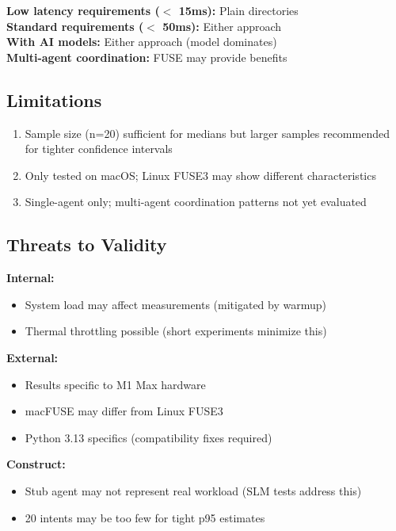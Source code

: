 \documentclass[11pt]{article}
\begin{document}
\textbf{Low latency requirements ($<$ 15ms):} Plain directories\\
\textbf{Standard requirements ($<$ 50ms):} Either approach\\
\textbf{With AI models:} Either approach (model dominates)\\
\textbf{Multi-agent coordination:} FUSE may provide benefits

\subsection{Limitations}

\begin{enumerate}
\item Sample size (n=20) sufficient for medians but larger samples recommended for tighter confidence intervals
\item Only tested on macOS; Linux FUSE3 may show different characteristics
\item Single-agent only; multi-agent coordination patterns not yet evaluated
\end{enumerate}

\subsection{Threats to Validity}

\textbf{Internal:}
\begin{itemize}
\item System load may affect measurements (mitigated by warmup)
\item Thermal throttling possible (short experiments minimize this)
\end{itemize}

\textbf{External:}
\begin{itemize}
\item Results specific to M1 Max hardware
\item macFUSE may differ from Linux FUSE3
\item Python 3.13 specifics (compatibility fixes required)
\end{itemize}

\textbf{Construct:}
\begin{itemize}
\item Stub agent may not represent real workload (SLM tests address this)
\item 20 intents may be too few for tight p95 estimates
\end{itemize}
\end{document}
